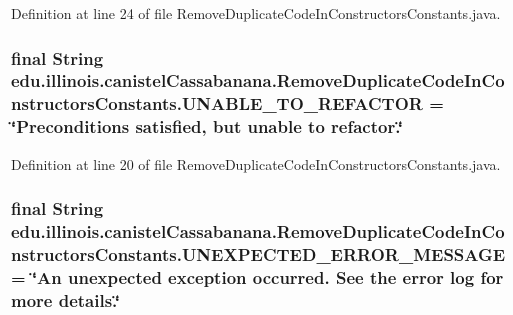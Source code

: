 Definition at line 24 of file RemoveDuplicateCodeInConstructorsConstants.java.

\hypertarget{classedu_1_1illinois_1_1canistelCassabanana_1_1RemoveDuplicateCodeInConstructorsConstants_af6677744b84dd45adf12fd7b89ed48ac}{
\subsubsection[{UNABLE\_\-TO\_\-REFACTOR}]{\setlength{\rightskip}{0pt plus 5cm}final String {\bf edu.illinois.canistelCassabanana.RemoveDuplicateCodeInConstructorsConstants.UNABLE\_\-TO\_\-REFACTOR} = \char`\"{}Preconditions satisfied, but unable to refactor.\char`\"{}}}
\label{classedu_1_1illinois_1_1canistelCassabanana_1_1RemoveDuplicateCodeInConstructorsConstants_af6677744b84dd45adf12fd7b89ed48ac}


Definition at line 20 of file RemoveDuplicateCodeInConstructorsConstants.java.

\hypertarget{classedu_1_1illinois_1_1canistelCassabanana_1_1RemoveDuplicateCodeInConstructorsConstants_a7a26202b57ca9d8cec6eff644aa32b0e}{
\subsubsection[{UNEXPECTED\_\-ERROR\_\-MESSAGE}]{\setlength{\rightskip}{0pt plus 5cm}final String {\bf edu.illinois.canistelCassabanana.RemoveDuplicateCodeInConstructorsConstants.UNEXPECTED\_\-ERROR\_\-MESSAGE} = \char`\"{}An unexpected exception occurred. See the error log for more details.\char`\"{}}}
\label{classedu_1_1illinois_1_1canistelCassabanana_1_1RemoveDuplicateCodeInConstructorsConstants_a7a26202b57ca9d8cec6eff644aa32b0e}


